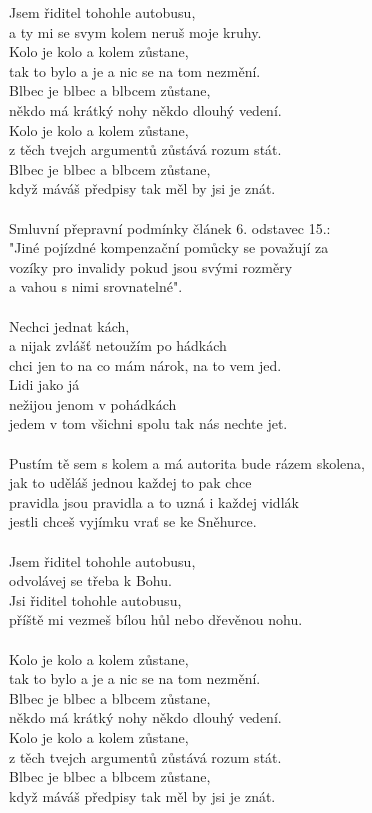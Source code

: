 \color{red}
Jsem řiditel tohohle autobusu,\\
a ty mi se svym kolem neruš moje kruhy.\\
\newpage
\color{black}
Kolo je kolo a kolem zůstane,\\
tak to bylo a je a nic se na tom nezmění.\\
Blbec je blbec a blbcem zůstane,\\
někdo má krátký nohy někdo dlouhý vedení.\\
Kolo je kolo a kolem zůstane,\\
z těch tvejch argumentů zůstává rozum stát.\\
Blbec je blbec a blbcem zůstane,\\
když máváš předpisy tak měl by jsi je znát.\\
\\
Smluvní přepravní podmínky článek 6. odstavec 15.:\\
"Jiné pojízdné kompenzační pomůcky se považují za \\
vozíky pro invalidy pokud jsou svými rozměry\\
a vahou s nimi srovnatelné".\\
\\
\color{blue}
Nechci jednat kách,\\
a nijak zvlášť netoužím po hádkách\\
chci jen to na co mám nárok, na to vem jed.\\
Lidi jako já\\
nežijou jenom v pohádkách\\
jedem v tom všichni spolu tak nás nechte jet.\\
\\
\color{red}
Pustím tě sem s kolem a má autorita bude rázem skolena,\\
jak to uděláš jednou každej to pak chce\\
pravidla jsou pravidla a to uzná i každej vidlák\\
jestli chceš vyjímku vrať se ke Sněhurce.\\
\\
Jsem řiditel tohohle autobusu,\\
odvolávej se třeba k Bohu.\\
\color{blue}
Jsi řiditel tohohle autobusu,\\
příště mi vezmeš bílou hůl nebo dřevěnou nohu.\\
\\
\color{black}
Kolo je kolo a kolem zůstane,\\
tak to bylo a je a nic se na tom nezmění.\\
Blbec je blbec a blbcem zůstane,\\
někdo má krátký nohy někdo dlouhý vedení.\\
Kolo je kolo a kolem zůstane,\\
z těch tvejch argumentů zůstává rozum stát.\\
Blbec je blbec a blbcem zůstane,\\
když máváš předpisy tak měl by jsi je znát.\\